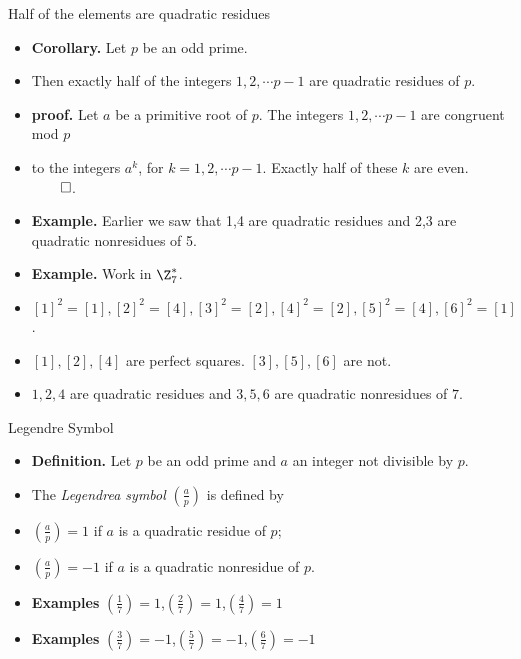 \documentclass[handout]{beamer}
\begin{document}
\begin{frame}{Half of the elements are quadratic residues}

\begin{itemize}
  \item \textbf{Corollary.} Let $p$ be an odd prime.
  \item Then exactly half of the integers $1,2,\cdots p-1$ are quadratic residues of $p$.
  \item \textbf{proof.} Let $a$ be a primitive root of $p$. The integers $1,2,\cdots p-1$ are congruent mod $p$
  \item to the integers $a^k$, for $k=1,2,\cdots p-1$. Exactly half of these $k$ are even. $\qed$.
  \item \textbf{Example.} Earlier we saw that 1,4 are quadratic residues and 2,3 are quadratic nonresidues of 5.
  \item \textbf{Example.} Work in $\Z^*_7$.
  \item $[1]^2=[1], [2]^2=[4], [3]^2=[2], [4]^2 = [2], [5]^2=[4], [6]^2=[1]$.
  \item $[1],[2],[4]$ are perfect squares. $[3],[5],[6]$ are not.
  \item $1,2,4$ are quadratic residues and $3,5,6$ are quadratic nonresidues of $7$.
\end{itemize}

\end{frame}

\begin{frame}{Legendre Symbol}

\begin{itemize}
  \item \textbf{Definition.} Let $p$ be an odd prime and $a$ an integer not divisible by $p$.
  \item The \emph{Legendrea symbol} $(\frac{a}{p})$ is defined by
  \item $(\frac{a}{p}) = 1$ if $a$ is a quadratic residue of $p$;
  \item $(\frac{a}{p}) = -1$ if $a$ is a quadratic nonresidue of $p$.
  \item \textbf{Examples} $(\frac{1}{7}) = 1$,$(\frac{2}{7}) = 1$,$(\frac{4}{7}) = 1$
  \item \textbf{Examples} $(\frac{3}{7}) = -1$,$(\frac{5}{7}) = -1$,$(\frac{6}{7}) = -1$
\end{itemize}

\end{frame}
\end{document}
